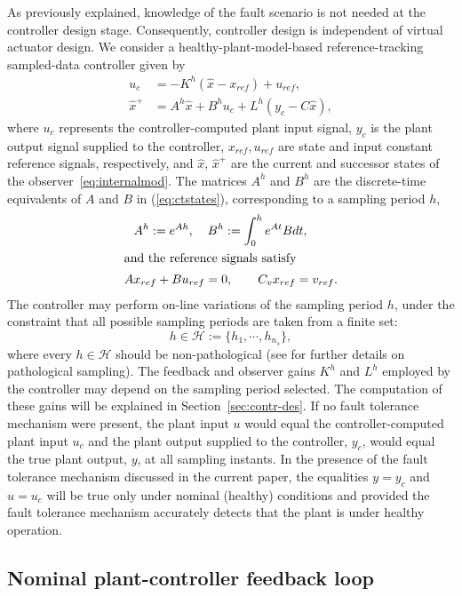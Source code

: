 \documentclass[letterpaper, 10 pt, conference]{ieeeconf}
\newcommand{\Hset}{\mathcal{H}}
\newcommand{\dfn}{:=}
\begin{document}
As previously explained, knowledge of the fault scenario is not needed
at the controller design stage. Consequently, controller design is
independent of virtual actuator design. We consider a
healthy-plant-model-based reference-tracking sampled-data controller
given by
\begin{align}
  \label{eq:unominal}
  u_c &= -K^h(\hat{x}-x_{ref}) + u_{ref}, \\
  \label{eq:internalmod}
  \hat{x}^+ &= A^h\hat{x}+B^hu_c+L^h(y_c-C\hat{x}),\end{align}
where $u_c$ represents the controller-computed plant input signal,
$y_c$ is the plant output signal supplied to the controller,
$x_{ref},u_{ref}$ are state and input constant reference signals,
respectively, and $\hat{x}$, $\hat{x}^+$ are the current and successor
states of the observer~\eqref{eq:internalmod}.
The matrices $A^h$ and $B^h$ are the discrete-time
equivalents of $A$ and $B$ in (\ref{eq:ctstates}), corresponding to a sampling period $h$,
\begin{align}
  \label{eq:aibi}
  A^h \dfn e^{Ah},\quad&\: B^h\dfn \int_0^h{e^{At}Bdt},
  \\ \intertext{and the reference signals satisfy}
  \label{eq:reference}
  A x_{ref} + B u_{ref} &=0, \qquad C_v x_{ref} = v_{ref}.
\end{align}
The controller may perform on-line variations of the sampling period
$h$, under the constraint that all possible sampling periods are taken
from a finite set:
\begin{equation}
 \label{eq:hset}
 h\in \Hset \dfn \{h_1,\cdots, h_{n_s}\},
\end{equation}
where every $h\in \Hset$ should be non-pathological (see \cite{ChF95}
for further details on pathological sampling). The feedback and
observer gains $K^h$ and $L^h$ employed by the controller may depend
on the sampling period selected. The computation of these gains will
be explained in Section~\ref{sec:contr-des}. If no fault tolerance
mechanism were present, the plant input $u$ would equal the
controller-computed plant input $u_c$ and the plant output supplied to
the controller, $y_c$, would equal the true plant output, $y$, at all
sampling instants. In the presence of the fault tolerance mechanism
discussed in the current paper, the equalities $y=y_c$ and $u=u_c$
will be true only under nominal (healthy) conditions and provided the
fault tolerance mechanism accurately detects that the plant is under
healthy operation. 
\subsection{Nominal plant-controller feedback loop}
\label{sec:nom-plant-contr}
\end{document}
